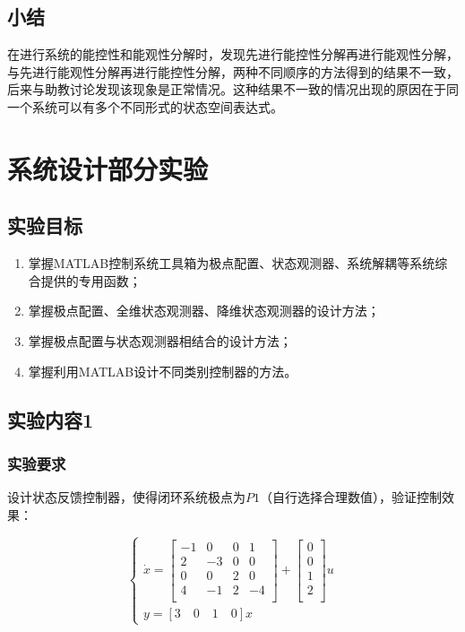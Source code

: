 \documentclass[UTF8]{article}
\begin{document}
\subsection{小结}
在进行系统的能控性和能观性分解时，发现先进行能控性分解再进行能观性分解，与先进行能观性分解再进行能控性分解，两种不同顺序的方法得到的结果不一致，后来与助教讨论发现该现象是正常情况。这种结果不一致的情况出现的原因在于同一个系统可以有多个不同形式的状态空间表达式。

\section{系统设计部分实验}
\subsection{实验目标}

\begin{enumerate}
    \item 掌握MATLAB控制系统工具箱为极点配置、状态观测器、系统解耦等系统综合提供的专用函数；
    \item 掌握极点配置、全维状态观测器、降维状态观测器的设计方法；
    \item 掌握极点配置与状态观测器相结合的设计方法；
    \item 掌握利用MATLAB设计不同类别控制器的方法。
\end{enumerate}

\subsection{实验内容1}
\subsubsection{实验要求}

设计状态反馈控制器，使得闭环系统极点为$P1$（自行选择合理数值），验证控制效果：

$$
\begin{cases}
    \dot{x} = 
    \begin{bmatrix}
        -1 & 0 & 0 & 1 \\
        2 & -3 & 0 & 0 \\
        0 & 0 & 2 & 0 \\
        4 & -1 & 2 & -4 \\
    \end{bmatrix} + 
    \begin{bmatrix}
        0 \\
        0 \\
        1 \\
        2 \\
    \end{bmatrix}u \\
    y = [3 \quad 0 \quad 1 \quad 0]x
\end{cases}
$$
\end{document}
